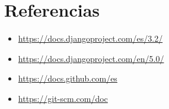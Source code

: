 \documentclass{article}
\begin{document}
	
  \newpage
  \section{Referencias}
    \begin{itemize}
      \item \url{https://docs.djangoproject.com/es/3.2/}
      \item \url{https://docs.djangoproject.com/en/5.0/}
      \item \url{https://docs.github.com/es}
      \item \url{https://git-scm.com/doc}
    \end{itemize}

%
%
%
			
\end{document}
